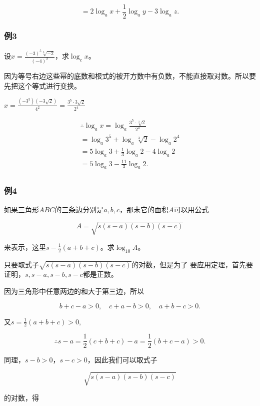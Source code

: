 \[
= 2 \log_{a} x + \frac{1}{2} \log_{a} y - 3 \log_{a} z.
\]

\subsubsection{例3}

设\(x = \frac{(-3)^5\sqrt[3]{-2}}{(-4)^2}\)，求\(\log_c x\)。

因为等号右边这些幂的底数和根式的被开方数中有负数，不能直接取对数。所以要先把这个等式进行变换。

\(x = \frac{(-3^5)(-3\sqrt{2})}{4^2} = \frac{3^5\cdot 3\sqrt{2}}{2^4}\)

\[
\begin{array}{l} \therefore \log_{a} x = \log_{a} \frac{3^{5} \cdot \sqrt[3]{2}}{2^{4}} \\ = \log_{a} 3^{5} + \log_{a} \sqrt[3]{2} - \log_{a} 2^{4} \\ = 5 \log_{a} 3 + \frac{1}{3} \log_{a} 2 - 4 \log_{a} 2 \\ = 5 \log_{a} 3 - \frac{11}{3} \log_{a} 2. \\ \end{array}
\]

\subsubsection{例4}

如果三角形\(ABC\)的三条边分别是\(a, b, c\)，那末它的面积\(A\)可以用公式

\[
A = \sqrt{s (s - a) (s - b) (s - c)}
\]

来表示，这里\(s - \frac{1}{2}(a + b + c)\)。求\(\log_{10} A\)。

只要取式子\(\sqrt{s(s - a)(s - b)(s - c)}\)的对数，但是为了
要应用定理，首先要证明，\(s, s - a, s - b, s - c\)都是正数。

 因为三角形中任意两边的和大于第三边，所以

\[
b + c - a > 0, \quad c + a - b > 0, \quad a + b - c > 0.
\]

又\(s = \frac{1}{2} (a + b + c) > 0,\)

\[
\therefore s - a = \frac{1}{2} (c + b + c) - a = \frac{1}{2} (b + c - a) > 0.
\]

同理，\(s - b > 0\)，\(s - c > 0\)，因此我们可以取式子

\[
\sqrt{s (s - a) (s - b) (s - c)}
\]

的对数，得

